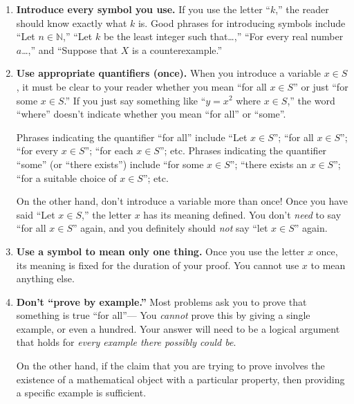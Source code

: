 \documentclass[11pt]{article}
\begin{document}
\begin{enumerate}
\item \textbf{Introduce every symbol you use.}
        If you use the letter ``$k$,'' the reader should know exactly what $k$ is.
        Good phrases for introducing symbols include
          ``Let $n\in \mathbb{N}$,''
          ``Let $k$ be the least integer such that\ldots,''
          ``For every real number $a$\ldots,''
          and
          ``Suppose that $X$ is a counterexample.''
          
\item \textbf{Use appropriate quantifiers (once).}
        When you introduce a variable $x\in S$, 
        it must be clear to your reader whether you mean ``for all $x\in S$''
        or just ``for some $x\in S$.''
        If you just say something like ``$y=x^2$ where $x\in S$,''
        the word ``where'' doesn't indicate whether you mean ``for all'' or ``some''.
        
        Phrases indicating the quantifier ``for all'' include 
           ``Let $x\in S$'';
           ``for all $x\in S$'';
           ``for every $x\in S$'';
           ``for each $x\in S$''; etc.
        Phrases indicating the quantifier ``some'' (or ``there exists'') include
           ``for some $x\in S$'';
           ``there exists an $x\in S$'';
           ``for a suitable choice of $x\in S$''; etc.
        
        On the other hand, don't introduce a variable more than once!
        Once you have said ``Let $x\in S$,''
        the letter $x$ has its meaning defined.
        You don't \emph{need} to say ``for all $x\in S$'' again,
        and you definitely should \emph{not} say ``let $x\in S$'' again.

\item \textbf{Use a symbol to mean only one thing.}
        Once you use the letter $x$ once,
        its meaning is fixed for the duration of your proof.
        You cannot use $x$ to mean anything else.

\item \textbf{Don't ``prove by example.''}\label{pfbyexample}
        Most problems ask you to prove that something is true ``for all''---%
        You \emph{cannot} prove this by giving a single example, or even a hundred.
        Your answer will need to be a logical argument that holds for \emph{every example there possibly could be}.

On the other hand, if the claim that you are trying to prove involves the existence of a mathematical object with a particular property, then providing a specific example is sufficient.
        

\end{enumerate}
\end{document}
